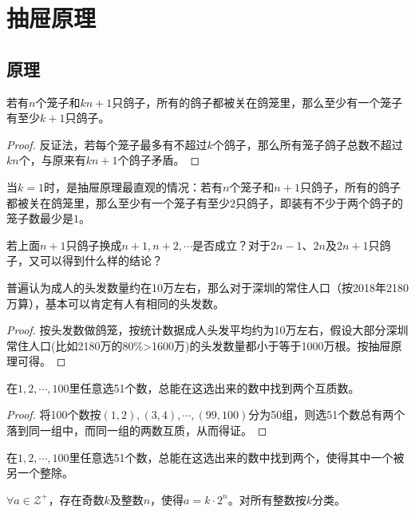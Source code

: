
\chapter{抽屉原理}
\label{chap:pigeonhole-principle}

\section{原理}
\label{sec:pigeonhole-principle-theory}

\begin{theorem}
  若有$n$个笼子和$kn+1$只鸽子，所有的鸽子都被关在鸽笼里，那么至少有一个笼子有至少$k+1$只鸽子。
\end{theorem}

\begin{proof}
  反证法，若每个笼子最多有不超过$k$个鸽子，那么所有笼子鸽子总数不超过$kn$个，与原来有$kn+1$个鸽子矛盾。
\end{proof}

当$k=1$时，是抽屉原理最直观的情况：若有$n$个笼子和$n+1$只鸽子，所有的鸽子都被关在鸽笼里，那么至少有一个笼子有至少$2$只鸽子，即装有不少于两个鸽子的笼子数最少是$1$。

\think 若上面$n+1$只鸽子换成$n+1,n+2,\cdots$是否成立？对于$2n-1$、$2n$及$2n+1$只鸽子，又可以得到什么样的结论？

\begin{example}
  普遍认为成人的头发数量约在10万左右，那么对于深圳的常住人口（按2018年2180万算），基本可以肯定有人有相同的头发数。
\end{example}

\begin{proof}
  按头发数做鸽笼，按统计数据成人头发平均约为10万左右，假设大部分深圳常住人口(比如2180万的80\%>1600万)的头发数量都小于等于1000万根。按抽屉原理可得。
\end{proof}

\begin{example}
  在$1,2,\cdots,100$里任意选51个数，总能在这选出来的数中找到两个互质数。
\end{example}

\begin{proof}
  将100个数按$(1,2), (3,4), \cdots, (99,100)$分为50组，则选51个数总有两个落到同一组中，而同一组的两数互质，从而得证。
\end{proof}

\begin{question}
  在$1,2,\cdots,100$里任意选51个数，总能在这选出来的数中找到两个，使得其中一个被另一个整除。
\end{question}
\hints $\forall a\in\mathcal{Z}^+$，存在奇数$k$及整数$n$，使得$a=k\cdot 2^n$。对所有整数按$k$分类。

